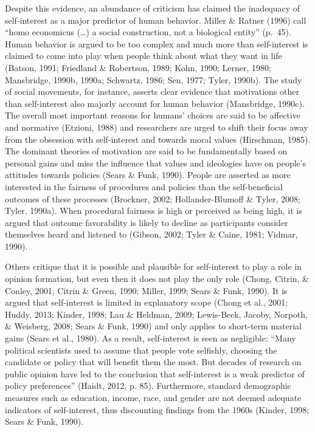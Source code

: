 \documentclass[12pt,econ]{sources/authesis}
\begin{document}
Despite this evidence, an abundance of criticism has claimed the inadequacy of self-interest as a major predictor of human behavior. Miller \& Ratner (1996) call ``homo economicus (\ldots) a social construction, not a biological entity'' (p.~45). Human behavior is argued to be too complex and much more than self-interest is claimed to come into play when people think about what they want in life (Batson, 1991; Friedland \& Robertson, 1989; Kohn, 1990; Lerner, 1980; Mansbridge, 1990b, 1990a; Schwartz, 1986; Sen, 1977; Tyler, 1990b). The study of social movements, for instance, asserts clear evidence that motivations other than self-interest also majorly account for human behavior (Mansbridge, 1990c). The overall most important reasons for humans' choices are said to be affective and normative (Etzioni, 1988) and researchers are urged to shift their focus away from the obsession with self-interest and towards moral values (Hirschman, 1985). The dominant theories of motivation are said to be fundamentally based on personal gains and miss the influence that values and ideologies have on people's attitudes towards policies (Sears \& Funk, 1990). People are asserted as more interested in the fairness of procedures and policies than the self-beneficial outcomes of these processes (Brockner, 2002; Hollander-Blumoff \& Tyler, 2008; Tyler, 1990a). When procedural fairness is high or perceived as being high, it is argued that outcome favorability is likely to decline as participants consider themselves heard and listened to (Gibson, 2002; Tyler \& Caine, 1981; Vidmar, 1990).

Others critique that it is possible and plausible for self-interest to play a role in opinion formation, but even then it does not play the only role (Chong, Citrin, \& Conley, 2001; Citrin \& Green, 1990; Miller, 1999; Sears \& Funk, 1990). It is argued that self-interest is limited in explanatory scope (Chong et al., 2001; Huddy, 2013; Kinder, 1998; Lau \& Heldman, 2009; Lewis-Beck, Jacoby, Norpoth, \& Weisberg, 2008; Sears \& Funk, 1990) and only applies to short-term material gains (Sears et al., 1980). As a result, self-interest is seen as negligible: ``Many political scientists used to assume that people vote selfishly, choosing the candidate or policy that will benefit them the most. But decades of research on public opinion have led to the conclusion that self-interest is a weak predictor of policy preferences'' (Haidt, 2012, p. 85). Furthermore, standard demographic measures such as education, income, race, and gender are not deemed adequate indicators of self-interest, thus discounting findings from the 1960s (Kinder, 1998; Sears \& Funk, 1990).
\end{document}
